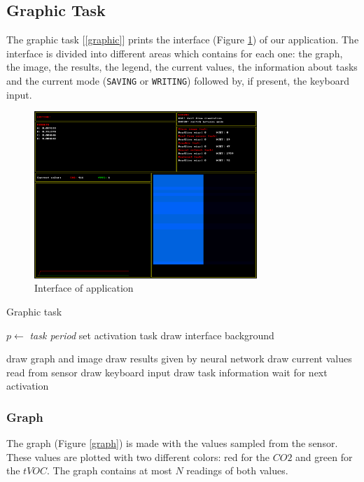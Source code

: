 \documentclass[12pt]{article}
\begin{document}
\subsection{Graphic Task}

The graphic task [\ref{graphic}] prints the interface (Figure
\ref{interface}) of our application. The interface is divided into different
areas which contains for each one: the graph, the image, the results, the
legend, the current values, the information about tasks and the current
mode (\texttt{SAVING} or \texttt{WRITING}) followed by, if present, the
keyboard input.

\begin{figure}[H]
    \centering
    \includegraphics[width=0.75\textwidth]{images/interface.png}
    \caption{Interface of application}
    \label{interface}
\end{figure}

\begin{algorithm}[H]
\caption{Graphic task}
\label{graphic}

\begin{algorithmic}
\State $p\gets$ \textit{task period}
\State set activation task
\State draw interface background

\Loop
\State draw graph and image
\State draw results given by neural network
\State draw current values read from sensor
\State draw keyboard input
\State draw task information
\State wait for next activation
\EndLoop

\end{algorithmic}
\end{algorithm}

\subsubsection*{Graph}
The graph (Figure \ref{graph}) is made with the values sampled from the 
sensor. These values are plotted with two different colors: red for the $CO2$
and green for the $tVOC$. The graph contains at most $N$ readings of both values.
\end{document}
